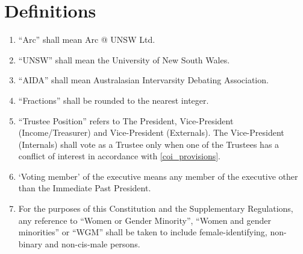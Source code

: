 \newpage
\section{Definitions}

\begin{enumerate}
\item “Arc” shall mean Arc @ UNSW Ltd.
\item “UNSW” shall mean the University of New South Wales.
\item “AIDA” shall mean Australasian Intervarsity Debating Association.
\item “Fractions” shall be rounded to the nearest integer.
\item “Trustee Position” refers to The President, Vice-President (Income/Treasurer) and Vice-President (Externals). The Vice-President (Internals) shall vote as a Trustee only when one of the Trustees has a conflict of interest in accordance with \ref{coi_provisions}.
\item ‘Voting member’ of the executive means any member of the executive other than the Immediate Past President.
\item For the purposes of this Constitution and the Supplementary Regulations, any reference to “Women or Gender Minority”, “Women and gender minorities” or “WGM” shall be taken to include female-identifying, non-binary and non-cis-male persons.
\end{enumerate}